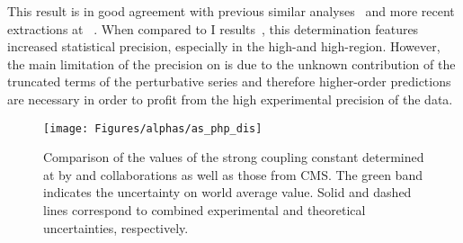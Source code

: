 This result is in good agreement with previous similar analyses~\cite{HERAIjets} and more recent extractions at \hera~\cite{britzger}. When compared to \hera I results~\cite{}, this determination features increased statistical precision, especially in the high-\etjetb and high-\qsq region. However, the main limitation of the precision on \asz is due to the unknown contribution of the truncated terms of the perturbative series and therefore higher-order predictions are necessary in order to profit from the high experimental precision of the data.

\begin{figure}[htpb]
	\centering
		\texttt{[image: Figures/alphas/as\_php\_dis]}
	\caption{Comparison of the values of the strong coupling constant determined at \hera by \hone and \zeus collaborations as well as those from CMS. The green band indicates the uncertainty on world average \as value. Solid and dashed lines correspond to combined experimental and theoretical uncertainties, respectively.}
	\label{fig:as_php_dis}
\end{figure}

